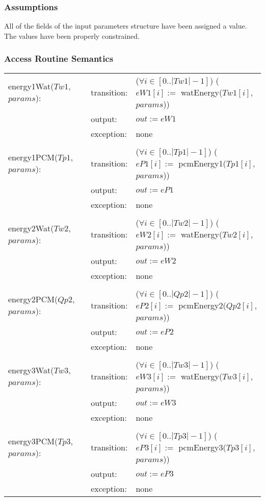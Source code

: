 \documentclass[12pt]{article}
\begin{document}
\subsubsection{Assumptions}
All of the fields of the input parameters structure have been assigned a value. The values have been properly constrained.
\subsubsection{Access Routine Semantics}
\begin{center}
\begin{tabular}{l l p{6cm}}
energy1Wat($Tw1$, $params$): & transition: & ($\forall i \in [0..|Tw1| - 1]$) ($eW1[i] :=$ watEnergy($Tw1[i]$, $params$)) \\
& output: & $out := eW1$ \\ 
& exception: & none \\ \\
energy1PCM($Tp1$, $params$): & transition: & ($\forall i \in [0..|Tp1| - 1]$) ($eP1[i]:=$ pcmEnergy1($Tp1[i]$, $params$)) \\
& output: & $out := eP1$ \\ 
& exception: & none \\ \\
energy2Wat($Tw2$, $params$): & transition: & ($\forall i \in [0..|Tw2| - 1]$) ($eW2[i] :=$ watEnergy($Tw2[i]$, $params$)) \\
& output: & $out := eW2$ \\ 
& exception: & none \\ \\
energy2PCM($Qp2$, $params$): & transition: & ($\forall i \in [0..|Qp2| - 1]$) ($eP2[i] :=$ pcmEnergy2($Qp2[i]$, $params$)) \\
& output: & $out := eP2$ \\ 
& exception: & none \\ \\
energy3Wat($Tw3$, $params$): & transition: & ($\forall i \in [0..|Tw3| - 1]$) ($eW3[i] :=$ watEnergy($Tw3[i]$, $params$)) \\
& output: & $out := eW3$ \\ 
& exception: & none \\ \\
energy3PCM($Tp3$, $params$): & transition: & ($\forall i \in [0..|Tp3| - 1]$) ($eP3[i] :=$ pcmEnergy3($Tp3[i]$, $params$)) \\
& output: & $out := eP3$ \\
& exception: & none \\
\end{tabular}
\end{center}
\end{document}
